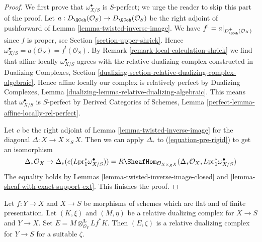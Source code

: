 \begin{proof}
We first prove that $\omega_{X/S}^\bullet$ is $S$-perfect; we urge
the reader to skip this part of the proof.
Let $a : D_\QCoh(\mathcal{O}_S) \to D_\QCoh(\mathcal{O}_S)$
be the right adjoint of pushforward of Lemma \ref{lemma-twisted-inverse-image}.
We have $f^! = a|_{D^+_\QCoh(\mathcal{O}_X)}$ since $f$ is
proper, see Section \ref{section-upper-shriek}.
Hence $\omega_{X/S}^\bullet = a(\mathcal{O}_S) = f^!(\mathcal{O}_S)$.
By Remark \ref{remark-local-calculation-shriek}
we find that affine locally $\omega_{X/S}^\bullet$
agrees with the relative dualizing complex constructed
in Dualizing Complexes, Section
\ref{dualizing-section-relative-dualizing-complex-algebraic}.
Hence affine locally our complex is relatively perfect
by Dualizing Complexes, Lemma
\ref{dualizing-lemma-relative-dualizing-algebraic}.
This means that $\omega_{X/S}^\bullet$ is $S$-perfect by
Derived Categories of Schemes, Lemma
\ref{perfect-lemma-affine-locally-rel-perfect}.

\medskip\noindent
Let $c$ be the right adjoint of
Lemma \ref{lemma-twisted-inverse-image}
for the diagonal $\Delta : X \to X \times_S X$.
Then we can apply $\Delta_*$ to (\ref{equation-pre-rigid})
to get an isomorphism
$$
\Delta_*\mathcal{O}_X \to
\Delta_*(c(L\text{pr}_1^*\omega_{X/S}^\bullet)) =
R\SheafHom_{\mathcal{O}_{X \times_S X}}(
\Delta_*\mathcal{O}_X, L\text{pr}_1^*\omega_{X/S}^\bullet)
$$
The equality holds by
Lemmas \ref{lemma-twisted-inverse-image-closed} and
\ref{lemma-sheaf-with-exact-support-ext}.
This finishes the proof.
\end{proof}

\begin{lemma}
\label{lemma-relative-dualizing-composition}
Let $f : Y \to X$ and $X \to S$ be morphisms of schemes
which are flat and of finite presentation.
Let $(K, \xi)$ and $(M, \eta)$
be a relative dualizing complex for $X \to S$ and $Y \to X$.
Set $E = M \otimes_{\mathcal{O}_Y}^\mathbf{L} Lf^*K$.
Then $(E, \zeta)$ is a relative dualizing complex for $Y \to S$ for
a suitable $\zeta$.
\end{lemma}

